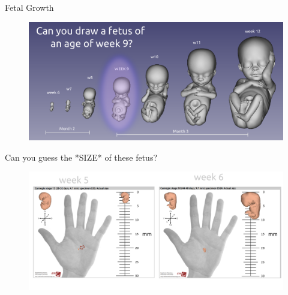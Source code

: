 {
\begin{frame}{Fetal Growth}
      \begin{figure}
        \centering
        \includegraphics[width=1.0\textwidth]{./figures/fetal-growth/versions/drawing-v02.png}
      \end{figure}
\end{frame}
}







{
\begin{frame}{Can you guess the *SIZE* of these fetus?}
      \begin{figure}
        \centering
        \includegraphics[width=1.0\textwidth]{./figures/fetal-size/versions/drawing-v01.png}
      \end{figure}
\end{frame}
}




